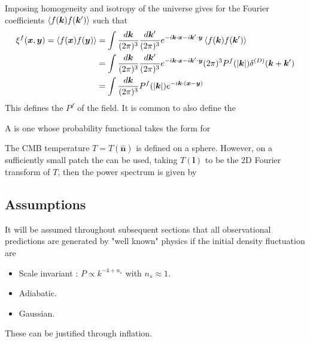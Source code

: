 \documentclass{article}
\begin{document}
\begin{lemma}
Imposing homogeneity and isotropy of the universe gives 
for the Fourier coefficients $\braket{f(\bm{k})f(\bm{k}^\prime)}$ such that 
\begin{align}\label{eq:CSM:15}
 \xi^f(\bm{x},\bm{y}) = \braket{f(\bm{x})f(\bm{y})} &= \int \frac{d\bm{k}}{(2\pi)^3} \frac{d\bm{k}^\prime}{(2\pi)^3} e^{-i\bm{k}\cdot\bm{x} -i \bm{k}^\prime \cdot \bm{y}} \braket{f(\bm{k})f(\bm{k}^\prime)} \\
 &=\int \frac{d\bm{k}}{(2\pi)^3} \frac{d\bm{k}^\prime}{(2\pi)^3} e^{-i\bm{k}\cdot\bm{x} -i \bm{k}^\prime \cdot \bm{y}}  (2\pi)^3 P^f(|\bm{k}|) \delta^{(D)}(\bm{k} + \bm{k}^\prime) \\
 &= \int \frac{d\bm{k}}{(2\pi)^3} P^f(|\bm{k}|) e^{-i\bm{k} \cdot (\bm{x} - \bm{y})}
\end{align}
This defines the  $P^f$ of the field. It is common to also define the  
\end{lemma}

\begin{definition}
A  is one whose probability functional takes the form 
for 
\end{definition}

\begin{definition}
The CMB temperature $T=T(\hat{\bm{n}})$ is defined on a sphere. However, on a sufficiently small patch the  can be used, taking $T(\bm{l})$ to be the 2D Fourier transform of $T$, then the power spectrum is given by 
\end{definition}

\subsection{Assumptions}
It will be assumed throughout subsequent sections that all observational predictions are generated by "well known" physics if the initial density fluctuation are 
\begin{itemize}
    \item Scale invariant : $P \propto k^{-4 + n_s}$ with $n_s \approx 1$. 
    \item Adiabatic. 
    \item Gaussian.
\end{itemize}
These can be justified through inflation. 
\end{document}
